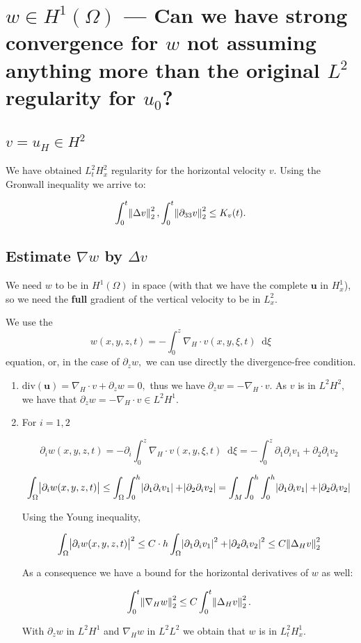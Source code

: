 \documentclass[11pt]{article}
\newcommand*\diff{\mathop{}\!\mathrm{d}}
\begin{document}
\section{$w \in H^1 (\Omega)$ --- Can we have strong convergence for $w$ not assuming anything more than the original $L^2$ regularity for $u_0$?}

\subsection{$v = u_H \in H^2$}

We have obtained $L^2_t H^2_x$ regularity for the horizontal velocity $v.$ Using the Gronwall inequality we arrive to:

$$ \int_0^t \norm{\Delta v}_2^2, \int_0^t \norm{\partial_{33}v}_2^2 \leq K_v(t).$$

\subsection{Estimate $\nabla w$ by $\Delta v$}

We need $w$ to be in $H^1(\Omega)$ in space (with that we have the complete $\mathbf{u}$ in $H^1_x$), so we need the \textbf{full} gradient of the vertical velocity to be in $L^2_x.$

We use the $$ w(x,y,z,t) = - \int_0^z \nabla_H \cdot v(x,y,\xi, t) \diff \xi$$ equation, or, in the case of $\partial_z w,$ we can use directly the divergence-free condition.

\begin{enumerate}

\item $\text{div}(\mathbf{u}) = \nabla_H \cdot v + \partial_z w = 0,$ thus we have $\partial_z w = - \nabla_H \cdot v.$ As $v$ is in $L^2 H^2,$ we have that $\partial_z w = - \nabla_H \cdot v \in L^2 H^1.$

\item For $i = 1,2$

$$ \partial_i w(x,y,z,t) = - \partial_i \int_0^z \nabla_H \cdot v(x,y,\xi, t) \diff \xi = - \int_0^z \partial_1 \partial_i v_1 + \partial_2 \partial_i v_2$$

$$ \int_\Omega \abs{\partial_i w(x,y,z,t)} \leq \int_\Omega \int_0^h \abs{\partial_1 \partial_i v_1} + \abs{\partial_2 \partial_i v_2} = \int_M \int_0^h \int_0^h \abs{\partial_1 \partial_i v_1} + \abs{\partial_2 \partial_i v_2}$$

Using the Young inequality,

$$ \int_\Omega \abs{\partial_i w(x,y,z,t)}^2 \leq C \cdot h \int_\Omega \abs{\partial_1 \partial_i v_1}^2 + \abs{\partial_2 \partial_i v_2}^2 \leq C \norm{\Delta_H v}^2_2$$

As a consequence we have a bound for the horizontal derivatives of $w$ as well:

$$\int_0^t \norm{\nabla_H w}_2^2 \leq C \int_0^t \norm{\Delta_H v}_2^2.$$

With $\partial_z w$ in $L^2 H^1$ and $\nabla_H w$ in $L^2 L^2$ we obtain that $w$ is in $L^2_t H^1_x.$

\end{enumerate}
\end{document}
